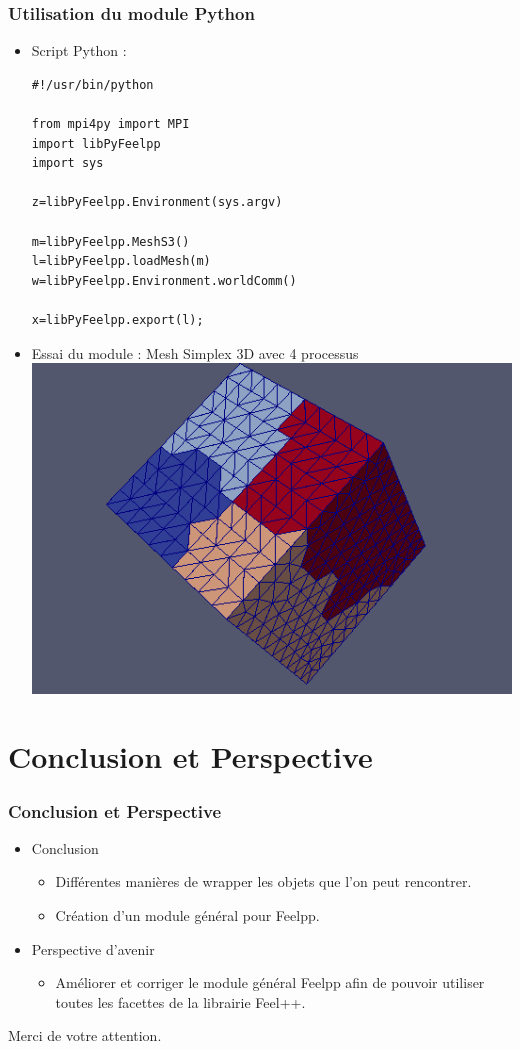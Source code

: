 \documentclass[french,10pt]{beamer}
\begin{document}
\begin{frame}[fragile]
\frametitle{Utilisation du module Python}
\begin{itemize}
\item Script Python :
\begin{lstlisting}
#!/usr/bin/python

from mpi4py import MPI
import libPyFeelpp
import sys

z=libPyFeelpp.Environment(sys.argv)

m=libPyFeelpp.MeshS3()
l=libPyFeelpp.loadMesh(m)
w=libPyFeelpp.Environment.worldComm()

x=libPyFeelpp.export(l);
\end{lstlisting}
\item Essai du module : Mesh Simplex 3D avec 4 processus
\includegraphics[scale=0.30]{MPI.png} 
\end{itemize}
\end{frame}

\section{Conclusion et Perspective}
\begin{frame}
\frametitle{Conclusion et Perspective}
\begin{itemize}
\item Conclusion
\begin{itemize}
\item  Différentes manières de wrapper les objets que l'on peut rencontrer.
\item Création d'un module général pour Feelpp.
\end{itemize}
\item Perspective d'avenir
\begin{itemize}
\item Améliorer et corriger le module général Feelpp afin de pouvoir utiliser toutes les facettes de la librairie Feel++. 
\end{itemize} 
\end{itemize}
\vspace{1 cm}
Merci de votre attention.
\end{frame}
\end{document}
